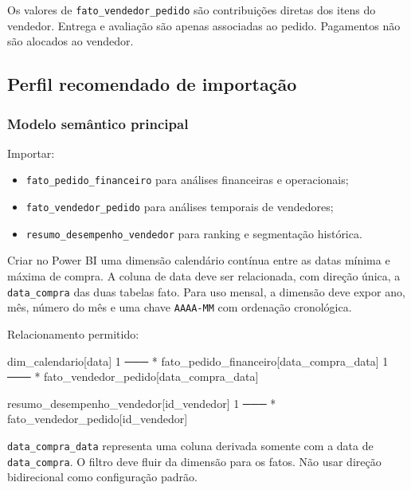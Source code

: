 \documentclass[12pt,a4paper]{article}
\providecommand{\tightlist}{
  \setlength{\itemsep}{0pt}\setlength{\parskip}{0pt}
}
\newenvironment{Shaded}{}{}
\newcommand{\NormalTok}[1]{#1}
\begin{document}
Os valores de \nolinkurl{fato_vendedor_pedido} são contribuições diretas
dos itens do vendedor. Entrega e avaliação são apenas associadas ao
pedido. Pagamentos não são alocados ao vendedor.

\subsection{Perfil recomendado de
importação}\label{docs__analytics__consumo_power_bi_sql.md__perfil-recomendado-de-importauxe7uxe3o}

\subsubsection{Modelo semântico
principal}\label{docs__analytics__consumo_power_bi_sql.md__modelo-semuxe2ntico-principal}

Importar:

\begin{itemize}
\tightlist
\item
  \nolinkurl{fato_pedido_financeiro} para análises financeiras e
  operacionais;
\item
  \nolinkurl{fato_vendedor_pedido} para análises temporais de
  vendedores;
\item
  \nolinkurl{resumo_desempenho_vendedor} para ranking e segmentação
  histórica.
\end{itemize}

Criar no Power BI uma dimensão calendário contínua entre as datas mínima
e máxima de compra. A coluna de data deve ser relacionada, com direção
única, a \nolinkurl{data_compra} das duas tabelas fato. Para uso mensal,
a dimensão deve expor ano, mês, número do mês e uma chave
\nolinkurl{AAAA-MM} com ordenação cronológica.

Relacionamento permitido:

\begin{Shaded}
\begin{Highlighting}[]
\NormalTok{dim\_calendario[data]}
\NormalTok{    1 ─── * fato\_pedido\_financeiro[data\_compra\_data]}
\NormalTok{    1 ─── * fato\_vendedor\_pedido[data\_compra\_data]}

\NormalTok{resumo\_desempenho\_vendedor[id\_vendedor]}
\NormalTok{    1 ─── * fato\_vendedor\_pedido[id\_vendedor]}
\end{Highlighting}
\end{Shaded}

\nolinkurl{data_compra_data} representa uma coluna derivada somente com
a data de \nolinkurl{data_compra}. O filtro deve fluir da dimensão para
os fatos. Não usar direção bidirecional como configuração padrão.
\end{document}
